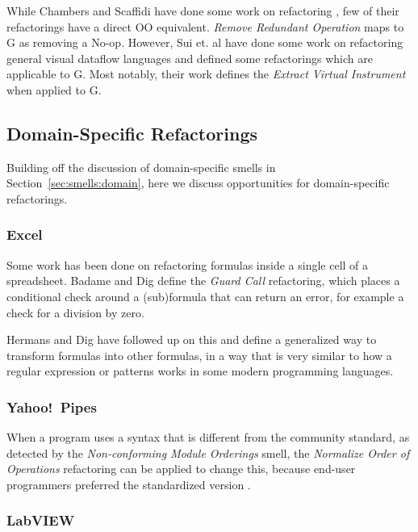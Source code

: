 \documentclass[10pt,conference,compsocconf]{IEEEtran}
\begin{document}
While Chambers and Scaffidi have done some work on refactoring \cite{chambers2015impact}, few of their refactorings have a direct OO equivalent.
\emph{Remove Redundant Operation} maps to G as removing a No-op.
However, Sui et. al \cite{sui2008automated} have done some work on refactoring general visual dataflow languages and defined some refactorings which are applicable to G.
Most notably, their work defines the \textit{Extract Virtual Instrument} when applied to G.

\subsection{Domain-Specific Refactorings}

Building off the discussion of domain-specific smells in Section~\ref{sec:smells:domain}, here we discuss opportunities for domain-specific refactorings. 

\subsubsection{Excel}

Some work has been done on refactoring formulas inside a single cell of a spreadsheet.
Badame and Dig \cite{badame2012refactoring} define the \textit{Guard Call} refactoring, which places a conditional check around a (sub)formula that can return an error, for example a check for a division by zero.

Hermans and Dig \cite{hermans2014bumblebee} have followed up on this and define a generalized way to transform formulas into other formulas, in a way that is very similar to how a regular expression or patterns works in some modern programming languages.

\subsubsection{Yahoo!\ Pipes}
\label{sec:yp:domainrefactor}
When a program uses a syntax that is different from the community standard, as detected by the \emph{Non-conforming Module Orderings} smell, the \emph{Normalize Order of Operations} refactoring can be applied to change this, because end-user programmers preferred the standardized version \cite{StoleeTSE2013}. 

\subsubsection{LabVIEW}
\end{document}
